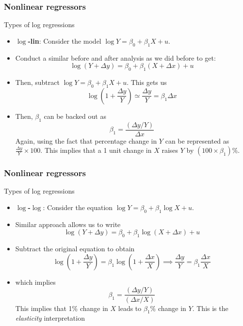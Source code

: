 \documentclass[compress]{beamer}
\begin{document}
\begin{frame}
\frametitle{Nonlinear regressors}
Types of log regressions
\begin{itemize}
\item\textbf{$\log$-lin}: Consider the model $\log{Y}=\beta_0 + \beta_1 X+u$. 
\item Conduct a similar before and after analysis as we did before to get:
\[
\log(Y+\Delta y) = \beta_0 + \beta_1(X+\Delta x)+u
\]
\item Then, subtract $\log{Y}=\beta_0 + \beta_1 X+u$. This gets us
\[
\log\left(1+\frac{\Delta y}{Y}\right)\simeq \frac{\Delta y}{Y} = \beta_1 \Delta x
\]
\item Then, $\beta_1$ can be backed out as
\[
\beta_1 = \frac{(\Delta y / Y)}{\Delta x}
\]
Again, using the fact that percentage change in $Y$ can be represented as $\frac{\Delta y}{Y}\times 100$. This implies that a 1 unit change in $X$ raises $Y$ by $(100\times \beta_1)\%$. 
\end{itemize}
\end{frame}

\begin{frame}
\frametitle{Nonlinear regressors}
Types of log regressions
\begin{itemize}
\item\textbf{$\log$-$\log$}: Consider the equation $\log{Y} = \beta_0 + \beta_1\log{X}+u$. 
\item Similar approach allows us to write
\[
\log(Y+\Delta y) = \beta_0 + \beta_1 \log(X+\Delta x)+u
\]
\item Subtract the original equation to obtain
\[
\log\left(1+\frac{\Delta y}{Y}\right)=\beta_1\log\left(1+\frac{\Delta x}{X}\right) \implies \frac{\Delta y}{Y}=\beta_1\frac{\Delta x}{X}
\]
\item which implies 
\[
\beta_1 = \frac{(\Delta y/Y)}{(\Delta x/X)}
\]
This implies that 1\% change in $X$ leads to $\beta_1\%$ change in $Y$. This is the \textit{elasticity} interpretation
\end{itemize}
\end{frame}
\end{document}
